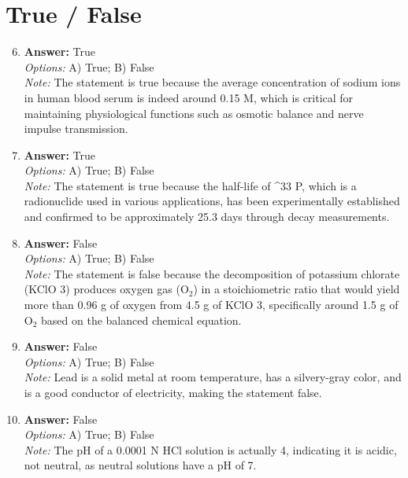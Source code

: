 \documentclass[12pt]{article}
\begin{document}
\section*{True / False}
\begin{enumerate}[label=\arabic*.]
\setcounter{enumi}{5}
\item \textbf{Answer:} True
\\ \textit{Options:} A) True; B) False
\\ \textit{Note:} The statement is true because the average concentration of sodium ions in human blood serum is indeed around 0.15 M, which is critical for maintaining physiological functions such as osmotic balance and nerve impulse transmission.
\item \textbf{Answer:} True
\\ \textit{Options:} A) True; B) False
\\ \textit{Note:} The statement is true because the half-life of ^33 P, which is a radionuclide used in various applications, has been experimentally established and confirmed to be approximately 25.3 days through decay measurements.
\item \textbf{Answer:} False
\\ \textit{Options:} A) True; B) False
\\ \textit{Note:} The statement is false because the decomposition of potassium chlorate (KClO 3) produces oxygen gas (O$_{2}$) in a stoichiometric ratio that would yield more than 0.96 g of oxygen from 4.5 g of KClO 3, specifically around 1.5 g of O$_{2}$ based on the balanced chemical equation.
\item \textbf{Answer:} False
\\ \textit{Options:} A) True; B) False
\\ \textit{Note:} Lead is a solid metal at room temperature, has a silvery-gray color, and is a good conductor of electricity, making the statement false.
\item \textbf{Answer:} False
\\ \textit{Options:} A) True; B) False
\\ \textit{Note:} The pH of a 0.0001 N HCl solution is actually 4, indicating it is acidic, not neutral, as neutral solutions have a pH of 7.
\end{enumerate}
\end{document}
